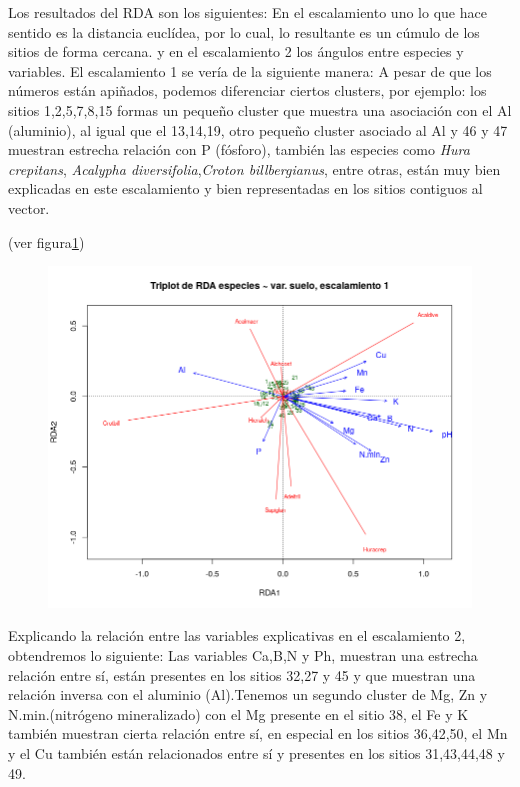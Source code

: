 \documentclass[11pt,]{article}
\begin{document}
Los resultados del RDA son los siguientes: En el escalamiento uno lo que
hace sentido es la distancia euclídea, por lo cual, lo resultante es un
cúmulo de los sitios de forma cercana. y en el escalamiento 2 los
ángulos entre especies y variables. El escalamiento 1 se vería de la
siguiente manera: A pesar de que los números están apiñados, podemos
diferenciar ciertos clusters, por ejemplo: los sitios 1,2,5,7,8,15
formas un pequeño cluster que muestra una asociación con el Al
(aluminio), al igual que el 13,14,19, otro pequeño cluster asociado al
Al y 46 y 47 muestran estrecha relación con P (fósforo), también las
especies como \emph{Hura crepitans}, \emph{Acalypha
diversifolia},\emph{Croton billbergianus}, entre otras, están muy bien
explicadas en este escalamiento y bien representadas en los sitios
contiguos al vector.

(ver figura\ref{fig:RDA1_euclidea})

\begin{figure}
\centering
\includegraphics{RDA1_euclidea.png}
\caption{\label{fig:RDA1_euclidea}}
\end{figure}

Explicando la relación entre las variables explicativas en el
escalamiento 2, obtendremos lo siguiente: Las variables Ca,B,N y Ph,
muestran una estrecha relación entre sí, están presentes en los sitios
32,27 y 45 y que muestran una relación inversa con el aluminio
(Al).Tenemos un segundo cluster de Mg, Zn y N.min.(nitrógeno
mineralizado) con el Mg presente en el sitio 38, el Fe y K también
muestran cierta relación entre sí, en especial en los sitios 36,42,50,
el Mn y el Cu también están relacionados entre sí y presentes en los
sitios 31,43,44,48 y 49.
\end{document}
